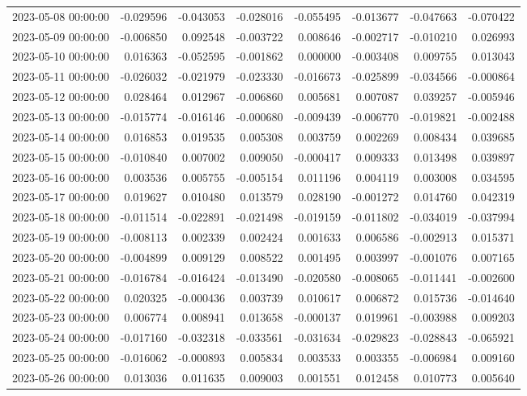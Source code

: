 \begin{tabular}{lrrrrrrr}
2023-05-08 00:00:00 & -0.029596 & -0.043053 & -0.028016 & -0.055495 & -0.013677 & -0.047663 & -0.070422 \\
2023-05-09 00:00:00 & -0.006850 & 0.092548 & -0.003722 & 0.008646 & -0.002717 & -0.010210 & 0.026993 \\
2023-05-10 00:00:00 & 0.016363 & -0.052595 & -0.001862 & 0.000000 & -0.003408 & 0.009755 & 0.013043 \\
2023-05-11 00:00:00 & -0.026032 & -0.021979 & -0.023330 & -0.016673 & -0.025899 & -0.034566 & -0.000864 \\
2023-05-12 00:00:00 & 0.028464 & 0.012967 & -0.006860 & 0.005681 & 0.007087 & 0.039257 & -0.005946 \\
2023-05-13 00:00:00 & -0.015774 & -0.016146 & -0.000680 & -0.009439 & -0.006770 & -0.019821 & -0.002488 \\
2023-05-14 00:00:00 & 0.016853 & 0.019535 & 0.005308 & 0.003759 & 0.002269 & 0.008434 & 0.039685 \\
2023-05-15 00:00:00 & -0.010840 & 0.007002 & 0.009050 & -0.000417 & 0.009333 & 0.013498 & 0.039897 \\
2023-05-16 00:00:00 & 0.003536 & 0.005755 & -0.005154 & 0.011196 & 0.004119 & 0.003008 & 0.034595 \\
2023-05-17 00:00:00 & 0.019627 & 0.010480 & 0.013579 & 0.028190 & -0.001272 & 0.014760 & 0.042319 \\
2023-05-18 00:00:00 & -0.011514 & -0.022891 & -0.021498 & -0.019159 & -0.011802 & -0.034019 & -0.037994 \\
2023-05-19 00:00:00 & -0.008113 & 0.002339 & 0.002424 & 0.001633 & 0.006586 & -0.002913 & 0.015371 \\
2023-05-20 00:00:00 & -0.004899 & 0.009129 & 0.008522 & 0.001495 & 0.003997 & -0.001076 & 0.007165 \\
2023-05-21 00:00:00 & -0.016784 & -0.016424 & -0.013490 & -0.020580 & -0.008065 & -0.011441 & -0.002600 \\
2023-05-22 00:00:00 & 0.020325 & -0.000436 & 0.003739 & 0.010617 & 0.006872 & 0.015736 & -0.014640 \\
2023-05-23 00:00:00 & 0.006774 & 0.008941 & 0.013658 & -0.000137 & 0.019961 & -0.003988 & 0.009203 \\
2023-05-24 00:00:00 & -0.017160 & -0.032318 & -0.033561 & -0.031634 & -0.029823 & -0.028843 & -0.065921 \\
2023-05-25 00:00:00 & -0.016062 & -0.000893 & 0.005834 & 0.003533 & 0.003355 & -0.006984 & 0.009160 \\
2023-05-26 00:00:00 & 0.013036 & 0.011635 & 0.009003 & 0.001551 & 0.012458 & 0.010773 & 0.005640 \\

\end{tabular}
